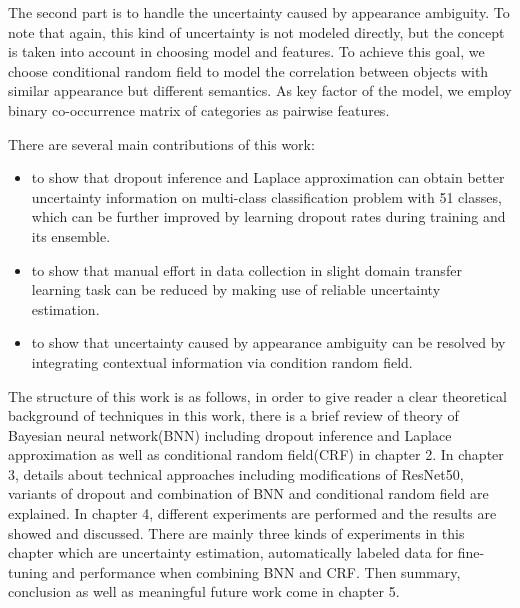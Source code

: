 The second part is to handle the uncertainty caused by appearance ambiguity. To note that again, this kind of uncertainty is not modeled directly, but the concept is taken into account in choosing model and features. To achieve this goal, we choose conditional random field to model the correlation between objects with similar appearance but different semantics. As key factor of the model, we employ binary co-occurrence matrix of categories as pairwise features.

There are several main contributions of this work:
\begin{itemize}
 \item to show that dropout inference and Laplace approximation can obtain better uncertainty information on multi-class classification problem with 51 classes, which can be further improved by learning dropout rates during training and its ensemble.
 
 \item to show that manual effort in data collection in slight domain transfer learning task can be reduced by making use of reliable uncertainty estimation.
 
 \item to show that uncertainty caused by appearance ambiguity can be resolved by integrating contextual information via condition random field.
 
 
\end{itemize}

The structure of this work is as follows, in order to give reader a clear theoretical background of techniques in this work, there is a brief review of theory of Bayesian neural network(BNN) including dropout inference and Laplace approximation as well as conditional random field(CRF) in chapter 2. In chapter 3, details about technical approaches including modifications of ResNet50, variants of dropout and combination of BNN and conditional random field are explained.  In chapter 4, different experiments are performed and the results are showed and discussed. There are mainly three kinds of experiments in this chapter which are uncertainty estimation, automatically labeled data for fine-tuning and performance when combining BNN and CRF. Then summary, conclusion as well as meaningful future work come in chapter 5.
